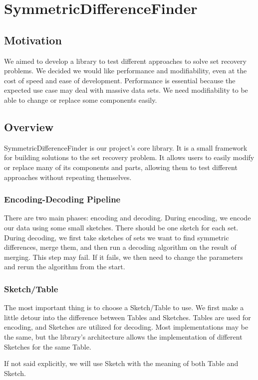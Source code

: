 \chapter{SymmetricDifferenceFinder}

\section{Motivation}
We aimed to develop a library to test different approaches to solve set recovery problems. We decided we would like performance and modifiability, even at the cost of speed and ease of development. Performance is essential because the expected use case may deal with massive data sets.  We need modifiability to be able to change or replace some components easily.

\section{Overview}
SymmetricDifferenceFinder is our project's core library. It is a small framework for building solutions to the set recovery problem. It allows users to easily modify or replace many of its components and parts, allowing them to test different approaches without repeating themselves.  

\subsection{Encoding-Decoding Pipeline}
There are two main phases: encoding and decoding. During encoding, we encode our data using some small sketches. There should be one sketch for each set. During decoding, we first take sketches of sets we want to find symmetric differences, merge them, and then run a decoding algorithm on the result of merging. This step may fail. If it fails, we then need to change the parameters and rerun the algorithm from the start.

\subsection{Sketch/Table}
The most important thing is to choose a Sketch/Table to use. We first make a little detour into the difference between Tables and Sketches. Tables are used for encoding, and Sketches are utilized for decoding. Most implementations may be the same, but the library's architecture allows the implementation of different Sketches for the same Table.

If not said explicitly, we will use Sketch with the meaning of both Table and Sketch.

